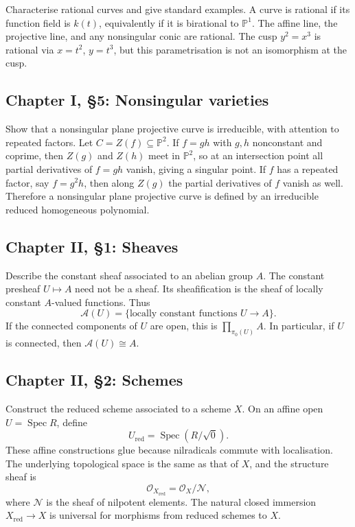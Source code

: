 \documentclass[12pt]{article}
\theoremstyle{plain}
\theoremstyle{definition}
\newcommand{\bb}[1]{\mathbb{#1}}
\newcommand{\Spec}{\operatorname{Spec}}
\begin{document}
\questionpar Characterise rational curves and give standard examples.
\solutionpar A curve is rational if its function field is $k(t)$, equivalently if it is birational to $\bb P^1$. The affine line, the projective line, and any nonsingular conic are rational. The cusp $y^2=x^3$ is rational via $x=t^2$, $y=t^3$, but this parametrisation is not an isomorphism at the cusp.

\subsection{Chapter I, \S 5: Nonsingular varieties}

\questionpar Show that a nonsingular plane projective curve is irreducible, with attention to repeated factors.
\solutionpar Let $C=Z(f)\subseteq\bb P^2$. If $f=gh$ with $g,h$ nonconstant and coprime, then $Z(g)$ and $Z(h)$ meet in $\bb P^2$, so at an intersection point all partial derivatives of $f=gh$ vanish, giving a singular point. If $f$ has a repeated factor, say $f=g^2h$, then along $Z(g)$ the partial derivatives of $f$ vanish as well. Therefore a nonsingular plane projective curve is defined by an irreducible reduced homogeneous polynomial.

\subsection{Chapter II, \S 1: Sheaves}

\questionpar Describe the constant sheaf associated to an abelian group $A$.
\solutionpar The constant presheaf $U\mapsto A$ need not be a sheaf. Its sheafification is the sheaf of locally constant $A$-valued functions. Thus
\[
\mathscr A(U)=\{\text{locally constant functions }U\to A\}.
\]
If the connected components of $U$ are open, this is $\prod_{\pi_0(U)}A$. In particular, if $U$ is connected, then $\mathscr A(U)\cong A$.

\subsection{Chapter II, \S 2: Schemes}

\questionpar Construct the reduced scheme associated to a scheme $X$.
\solutionpar On an affine open $U=\Spec R$, define
\[
U_{\mathrm{red}}=\Spec(R/\sqrt0).
\]
These affine constructions glue because nilradicals commute with localisation. The underlying topological space is the same as that of $X$, and the structure sheaf is
\[
\mathcal O_{X_{\mathrm{red}}}=\mathcal O_X/\mathcal N,
\]
where $\mathcal N$ is the sheaf of nilpotent elements. The natural closed immersion $X_{\mathrm{red}}\to X$ is universal for morphisms from reduced schemes to $X$.
\end{document}
